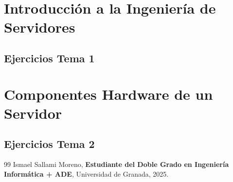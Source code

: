 \documentclass[a4paper,12pt]{book}
\begin{document}
\chapter{Introducción a la Ingeniería de Servidores}
% 
\section{Ejercicios Tema 1}
% 

% 


\chapter{Componentes Hardware de un Servidor}
% 

\section{Ejercicios Tema 2}

% 

% 


\newpage
\begin{thebibliography}{99}
Ismael Sallami Moreno, \textbf{Estudiante del Doble Grado en Ingeniería Informática + ADE}, Universidad de Granada, 2025.

\end{thebibliography}
\end{document}
